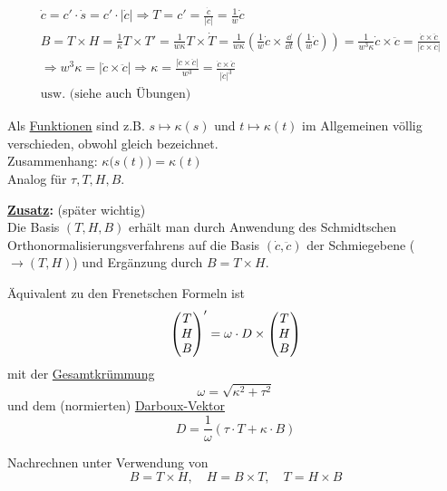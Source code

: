 \begin{beweis}
 \begin{align*}
  &\dot c = c' \cdot \dot s = c' \cdot |\dot c| \Rightarrow T = c' = \frac{\dot c}{|\dot c|} = \frac1w \dot c \\
  &B = T \times H = \frac1\kappa T \times T' = \frac1{w \kappa} T\times \dot T = \frac1{w \kappa} \left(\frac1w \dot c \times \frac{\dd}{\dd t}{\left(\frac1w \dot c\right)}\right) = \frac1{w^3 \kappa} \dot c \times \ddot c = \frac{\dot c \times \ddot c}{|\dot c \times \ddot c|} \\
  &\Rightarrow w^3 \kappa = |\dot c \times \ddot c| \Rightarrow \kappa = \frac{|\dot c \times \ddot c|}{w^3} = \frac{\dot c \times \ddot c}{|\dot c|^3} \\
  &\text{usw. (siehe auch Übungen)}
 \end{align*}

\end{beweis}

\begin{bemerkung}
 Als \uline{Funktionen} sind z.B. \(s \mapsto \kappa(s)\) und \(t \mapsto \kappa(t)\) im Allgemeinen völlig verschieden, obwohl gleich bezeichnet. \\
 Zusammenhang: \(\kappa\big(s(t)\big) = \kappa(t)\) \\
 Analog für \(\tau, T, H, B\).
\end{bemerkung}

\textbf{\uline{Zusatz}:} (später wichtig) \\
Die Basis \((T, H, B)\) erhält man durch Anwendung des Schmidtschen Orthonormalisierungsverfahrens auf die Basis \((\dot c, \ddot c)\) der Schmiegebene \big(\(\rightarrow (T,H)\)\big) und Ergänzung durch \(B = T \times H\).

\begin{satz}\label{satz135}
 Äquivalent zu den Frenetschen Formeln ist
 \[
  {\begin{pmatrix} T \\ H \\ B \end{pmatrix} }' = \omega \cdot D \times \begin{pmatrix} T \\ H \\ B \end{pmatrix} 
 \]
 mit der \uline{Gesamtkrümmung}
 \[
  \omega = \sqrt{\kappa^2 + \tau^2}
 \]
 und dem (normierten) \uline{Darboux-Vektor}
 \[
  D = \frac1\omega (\tau \cdot T + \kappa \cdot B)
 \]
\end{satz}

\begin{beweis}
Nachrechnen unter Verwendung von
\[
 B = T \times H, \quad H = B \times T, \quad T = H \times B
\]
\end{beweis}

